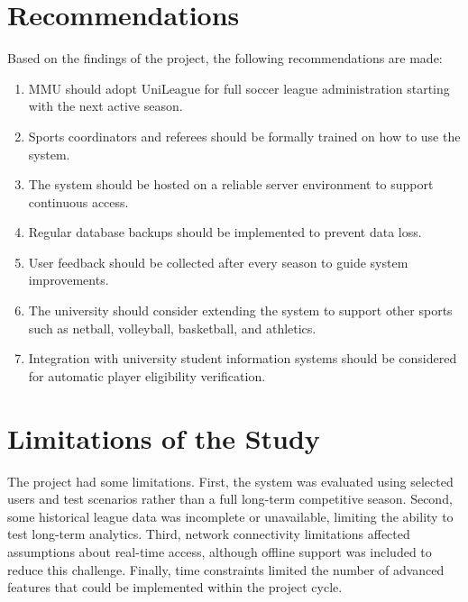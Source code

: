 \documentclass[12pt,a4paper]{report}
\begin{document}
\section{Recommendations}
Based on the findings of the project, the following recommendations are made:
\begin{enumerate}
  \item MMU should adopt UniLeague for full soccer league administration starting with the
        next active season.
  \item Sports coordinators and referees should be formally trained on how to use the system.
  \item The system should be hosted on a reliable server environment to support continuous access.
  \item Regular database backups should be implemented to prevent data loss.
  \item User feedback should be collected after every season to guide system improvements.
  \item The university should consider extending the system to support other sports such as
        netball, volleyball, basketball, and athletics.
  \item Integration with university student information systems should be considered for
        automatic player eligibility verification.
\end{enumerate}

\section{Limitations of the Study}
The project had some limitations. First, the system was evaluated using selected users and
test scenarios rather than a full long-term competitive season. Second, some historical
league data was incomplete or unavailable, limiting the ability to test long-term analytics.
Third, network connectivity limitations affected assumptions about real-time access, although
offline support was included to reduce this challenge. Finally, time constraints limited the
number of advanced features that could be implemented within the project cycle.
\end{document}

